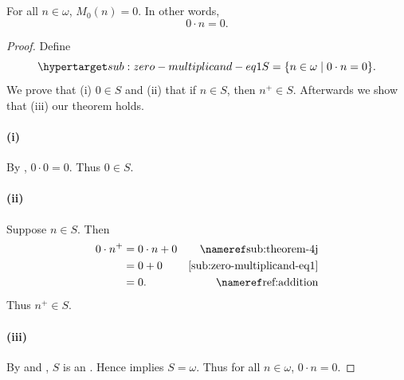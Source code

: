 \documentclass{report}
\begin{document}
\subsection{}%

\begin{lemma}[4]

  For all $n \in \omega$, $M_0(n) = 0$.
  In other words, $$0 \cdot n = 0.$$

\end{lemma}

\begin{proof}


  Define
    \begin{equation}
      \hyperlabel{sub:zero-multiplicand-eq1}
      S = \{n \in \omega \mid 0 \cdot n = 0\}.
    \end{equation}
  We prove that (i) $0 \in S$ and (ii) that if $n \in S$, then $n^+ \in S$.
  Afterwards we show that (iii) our theorem holds.

  \paragraph{(i)}%

    By , $0 \cdot 0 = 0$.
    Thus $0 \in S$.

  \paragraph{(ii)}%

    Suppose $n \in S$.
    Then
      \begin{align*}
        0 \cdot n^+
          & = 0 \cdot n + 0 & \textref{sub:theorem-4j} \\
          & = 0 + 0 & \eqref{sub:zero-multiplicand-eq1} \\
          & = 0. & \textref{ref:addition}
      \end{align*}
    Thus $n^+ \in S$.

  \paragraph{(iii)}%

    By  and ,
      $S$ is an .
    Hence  implies $S = \omega$.
    Thus for all $n \in \omega$, $0 \cdot n = 0$.

\end{proof}
\end{document}
